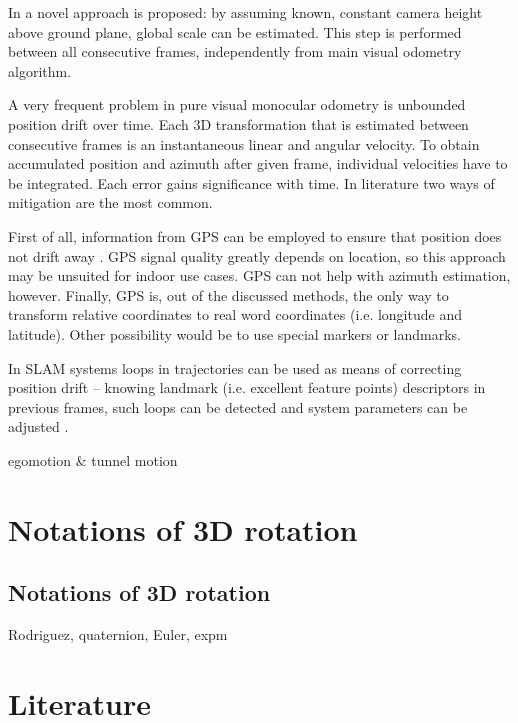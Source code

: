 In \cite{robust_scale} a novel approach is proposed: by assuming known, constant camera height above ground plane, global scale can be estimated. This step is performed between all consecutive frames, independently from main visual odometry algorithm.

A very frequent problem in pure visual monocular odometry is unbounded position drift over time. Each 3D transformation that is estimated between consecutive frames is an instantaneous linear and angular velocity. To obtain accumulated position and azimuth after given frame, individual velocities have to be integrated. Each error gains significance with time. In literature two ways of mitigation are the most common.


First of all, information from GPS can be employed to ensure that position does not drift away \cite{accurate_global_localization}. GPS signal quality greatly depends on location, so this approach may be unsuited for indoor use cases. GPS can not help with azimuth estimation, however. Finally, GPS is, out of the discussed methods, the only way to transform relative coordinates to real word coordinates (i.e. longitude and latitude). Other possibility would be to use special markers or landmarks.

In SLAM systems loops in trajectories can be used as means of correcting position drift -- knowing landmark (i.e. excellent feature points) descriptors in previous frames, such loops can be detected and system parameters can be adjusted \cite{the_application_of_kalman} \cite{monoslam}.


egomotion \& tunnel motion



\section{Notations of 3D rotation}
\label{sec:3dtrans}

\subsection{Notations of 3D rotation}

Rodriguez, quaternion, Euler, expm


\section{Literature}



